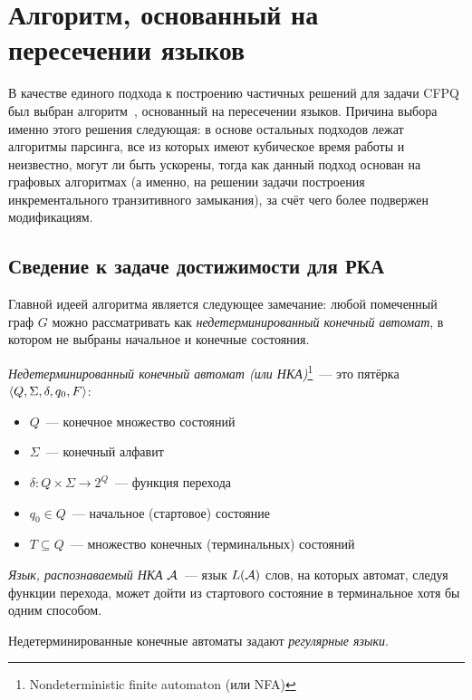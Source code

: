\section{Алгоритм, основанный на пересечении языков}\label{section:algo_idea}

В качестве единого подхода к построению частичных решений для задачи CFPQ был выбран алгоритм~\cite{Chaudhuri08, Orachev20}, основанный на пересечении языков. Причина выбора именно этого решения следующая: в основе остальных подходов лежат алгоритмы парсинга, все из которых имеют кубическое время работы и неизвестно, могут ли быть ускорены, тогда как данный подход основан на графовых алгоритмах (а именно, на решении задачи построения инкрементального транзитивного замыкания), за счёт чего более подвержен модификациям.

\subsection{Сведение к задаче достижимости для РКА}

Главной идеей алгоритма является следующее замечание: любой помеченный граф $G$ можно рассматривать как \textit{недетерминированный конечный автомат}, в котором не выбраны начальное и конечные состояния.

\begin{definition}

  \textit{Недетерминированный конечный автомат (или НКА)}\footnote{Nondeterministic finite automaton (или NFA)}~--- это пятёрка $\langle Q, \Sigma, \delta, q_0, F \rangle$:
  \vspace{-\topsep}
  \begin{itemize}
    \setlength\itemsep{-0.1em}
    \item $Q$~--- конечное множество состояний
    \item $\Sigma$~--- конечный алфавит
    \item $\delta \colon Q \times \Sigma \to 2^Q$~--- функция перехода
    \item $q_0 \in Q$~--- начальное (стартовое) состояние
    \item $T \subseteq Q$~--- множество конечных (терминальных) состояний
  \end{itemize}

  \textit{Язык, распознаваемый НКА} $\mathcal{A}$~--- язык $L(\mathcal{A})$ слов, на которых автомат, следуя функции перехода, может дойти из стартового состояние в терминальное хотя бы одним способом.

  Недетерминированные конечные автоматы задают \textit{регулярные языки}.

\end{definition}

